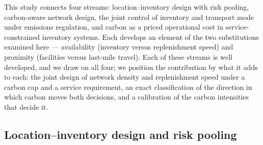 \documentclass[11pt]{article}
\theoremstyle{definition}
\theoremstyle{remark}
\theoremstyle{plain}
\begin{document}
This study connects four streams: location--inventory design with risk pooling, carbon-aware network design,
the joint control of inventory and transport mode under emissions regulation, and carbon as a priced
operational cost in service-constrained inventory systems. Each develops an element of the two substitutions
examined here --- availability (inventory versus replenishment speed) and proximity (facilities versus
last-mile travel). Each of these streams is well developed, and we draw on all four; we position the contribution by what it adds
to each: the joint design of network density and replenishment speed under a carbon cap and a service
requirement, an exact classification of the direction in which carbon moves both decisions, and a calibration of
the carbon intensities that decide it.

\subsection{Location--inventory design and risk pooling}
\end{document}
